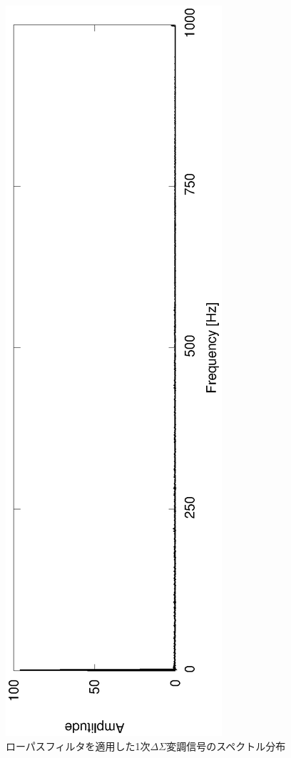 \documentclass[a4j]{jsarticle}
\begin{document}
\begin{figure}[H]
 \centering
 \vspace{-4cm}
 \hspace{-2cm}
 \includegraphics[angle=-90,scale=0.6]{1stout_LPF_spec.eps}
  \vspace{-2cm}
 \caption{ローパスフィルタを適用した1次$\Delta\Sigma$変調信号のスペクトル分布}
 \label{1lpfs}
\end{figure}
\end{document}

